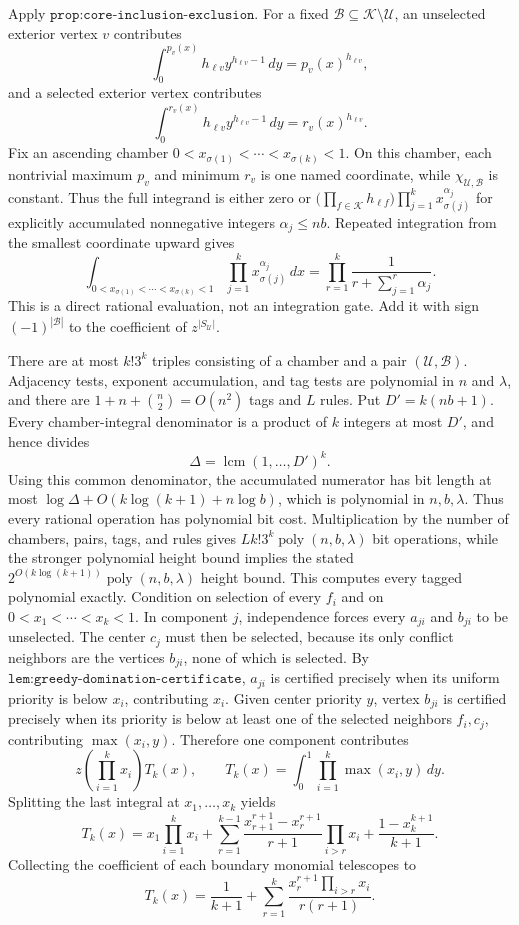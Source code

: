 Apply \(\texttt{prop:core-inclusion-exclusion}\).  For a fixed \(\mathcal B\subseteq\mathcal K\setminus\mathcal U\), an unselected exterior vertex \(v\) contributes
\[
 \int_0^{p_v(x)}h_{\ell v}y^{h_{\ell v}-1}\,dy
 =p_v(x)^{h_{\ell v}},
\]
and a selected exterior vertex contributes
\[
 \int_0^{r_v(x)}h_{\ell v}y^{h_{\ell v}-1}\,dy
 =r_v(x)^{h_{\ell v}}.
\]
Fix an ascending chamber \(0<x_{\sigma(1)}<\cdots<x_{\sigma(k)}<1\).  On this chamber, each nontrivial maximum \(p_v\) and minimum \(r_v\) is one named coordinate, while \(\chi_{\mathcal U,\mathcal B}\) is constant.  Thus the full integrand is either zero or \(\bigl(\prod_{f\in\mathcal K}h_{\ell f}\bigr)\prod_{j=1}^kx_{\sigma(j)}^{\alpha_j}\) for explicitly accumulated nonnegative integers \(\alpha_j\le nb\).  Repeated integration from the smallest coordinate upward gives
\[
 \int_{0<x_{\sigma(1)}<\cdots<x_{\sigma(k)}<1}
   \prod_{j=1}^kx_{\sigma(j)}^{\alpha_j}\,dx
 =\prod_{r=1}^k\frac{1}{r+\sum_{j=1}^r\alpha_j}.
\]
This is a direct rational evaluation, not an integration gate.  Add it with sign \((-1)^{|\mathcal B|}\) to the coefficient of \(z^{|S_{\mathcal U}|}\).

There are at most \(k!3^k\) triples consisting of a chamber and a pair \((\mathcal U,\mathcal B)\).  Adjacency tests, exponent accumulation, and tag tests are polynomial in \(n\) and \(\lambda\), and there are \(1+n+\binom n2=O(n^2)\) tags and \(L\) rules.  Put \(D'=k(nb+1)\).  Every chamber-integral denominator is a product of \(k\) integers at most \(D'\), and hence divides
\[
 \Delta=\operatorname{lcm}(1,\ldots,D')^k.
\]
Using this common denominator, the accumulated numerator has bit length at most \(\log\Delta+O(k\log(k+1)+n\log b)\), which is polynomial in \(n,b,\lambda\).  Thus every rational operation has polynomial bit cost.  Multiplication by the number of chambers, pairs, tags, and rules gives \(Lk!3^k\operatorname{poly}(n,b,\lambda)\) bit operations, while the stronger polynomial height bound implies the stated \(2^{O(k\log(k+1))}\operatorname{poly}(n,b,\lambda)\) height bound.  This computes every tagged polynomial exactly.
Condition on selection of every \(f_i\) and on \(0<x_1<\cdots<x_k<1\).  In component \(j\), independence forces every \(a_{ji}\) and \(b_{ji}\) to be unselected.  The center \(c_j\) must then be selected, because its only conflict neighbors are the vertices \(b_{ji}\), none of which is selected.  By \(\texttt{lem:greedy-domination-certificate}\), \(a_{ji}\) is certified precisely when its uniform priority is below \(x_i\), contributing \(x_i\).  Given center priority \(y\), vertex \(b_{ji}\) is certified precisely when its priority is below at least one of the selected neighbors \(f_i,c_j\), contributing \(\max(x_i,y)\).  Therefore one component contributes
\[
 z\left(\prod_{i=1}^kx_i\right)T_k(x),\qquad
 T_k(x)=\int_0^1\prod_{i=1}^k\max(x_i,y)\,dy.
\]
Splitting the last integral at \(x_1,\ldots,x_k\) yields
\[
 T_k(x)=x_1\prod_{i=1}^kx_i+
 \sum_{r=1}^{k-1}\frac{x_{r+1}^{r+1}-x_r^{r+1}}{r+1}
       \prod_{i>r}x_i+\frac{1-x_k^{k+1}}{k+1}.
\]
Collecting the coefficient of each boundary monomial telescopes to
\[
 T_k(x)=\frac1{k+1}+\sum_{r=1}^k
 \frac{x_r^{r+1}\prod_{i>r}x_i}{r(r+1)}.
\]

